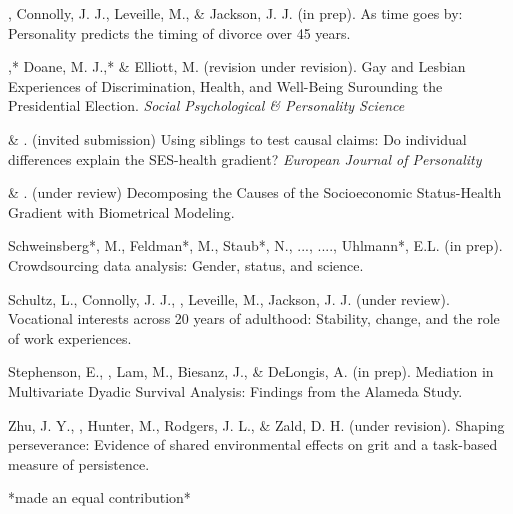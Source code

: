 
\item\meb, Connolly, J. J., Leveille, M., \& Jackson, J. J. (in prep). As time goes by: Personality predicts the timing of divorce over 45 years. %
\item\meb,* Doane, M. J.,* \& Elliott, M. (revision under revision). Gay and Lesbian Experiences of Discrimination, Health, and Well-Being Surounding the Presidential Election. \textit{Social Psychological \& Personality Science} %
\item \meb \& \joe. (invited submission) Using siblings to test causal claims: Do individual differences explain the SES-health gradient? \textit{European Journal of Personality}
\item \meb \& \joe.  (under review) Decomposing the Causes of the Socioeconomic Status-Health Gradient with Biometrical Modeling. %
\item Schweinsberg*, M., Feldman*, M., Staub*, N., ..., \meb ...., Uhlmann*, E.L. (in prep). Crowdsourcing data analysis: Gender, status, and science. 
\item Schultz, L., Connolly, J. J., \meb, Leveille, M., Jackson, J. J. (under review). Vocational interests across 20 years of adulthood: Stability, change, and the role of work experiences.%
\item Stephenson, E., \meb, Lam, M., Biesanz, J., \& DeLongis, A. (in prep). Mediation in Multivariate Dyadic Survival Analysis: Findings from the Alameda Study. %
\item Zhu, J. Y., \meb, Hunter, M., Rodgers, J. L., \& Zald, D. H. (under revision). Shaping perseverance: Evidence of shared environmental effects on grit and a task-based measure of persistence. %
\vspace{-2mm}\begin{center}\footnotesize{*made an equal contribution*}\end{center} \vspace{-3mm}
\vspace{-2mm}\begin{center}\end{center} \vspace{-4mm}